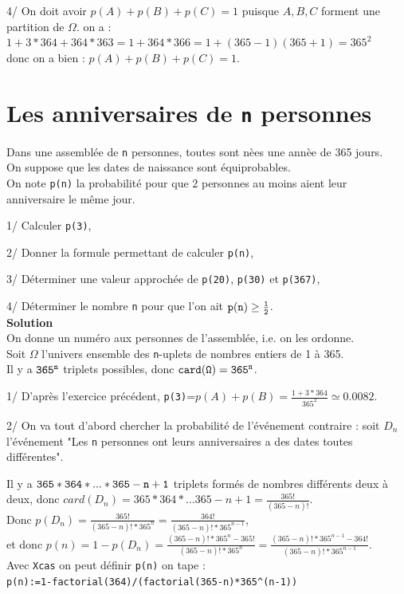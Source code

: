 \documentclass[a4paper,11pt]{book}
\begin{document}
4/ On doit avoir $p(A)+p(B)+p(C)=1$ puisque $A,B,C$ forment une partition de 
 $\Omega$. on a :\\
$1+3*364+364*363=1+364*366=1+(365-1)(365+1)=365^2$\\
donc on a bien : $p(A)+p(B)+p(C)=1$.\\
\section{Les anniversaires de {\tt n} personnes}
Dans une assembl\'ee de {\tt n} personnes, toutes sont n\`ees une ann\`ee de 
365 jours.\\
On suppose que les dates de naissance sont \'equiprobables.\\
On note {\tt p(n)} la probabilit\'e pour que 2 personnes au moins aient leur 
anniversaire le m\^eme jour.

1/ Calculer {\tt p(3)},

2/ Donner la formule permettant de calculer {\tt p(n)},

3/ D\'eterminer une valeur approch\'ee de 
{\tt p(20)}, {\tt p(30)} et {\tt p(367)},

4/ D\'eterminer le nombre {\tt n} pour que l'on ait 
${\tt p(n)\geq \frac{1}{2}}$.\\

{\bf Solution}\\
On donne un num\'ero aux personnes de l'assembl\'ee, i.e. on les ordonne.\\
Soit $\Omega$ l'univers ensemble des {\tt n}-uplets de nombres entiers de 1 
\`a 365.\\ 
Il y a ${\tt 365^n}$ triplets possibles, donc ${\tt card(\Omega)=365^n}$.

1/ D'apr\`es l'exercice pr\'ec\'edent, {\tt p(3)}=$p(A)+p(B)=\frac{1+3*364}{365^2}\simeq 0.0082$.

2/ On va tout d'abord chercher la probabilit\'e de l'\'ev\'enement contraire :
soit $D_n$ l'\'ev\'enement "Les {\tt n} personnes ont leurs anniversaires 
a des dates toutes diff\'erentes".

Il y a ${\tt 365*364*...*365-n+1}$ triplets form\'es de nombres diff\'erents 
deux \`a deux, donc $card(D_n)=365*364*...365-n+1=\frac{365!}{(365-n)!}$.\\ 
Donc $\displaystyle p(D_n)=\frac{365!}{(365-n)!*365^n}=\frac{364!}{(365-n)!*365^{n-1}}$,\\
et donc $\displaystyle p(n)=1-p(D_n)=\frac{(365-n)!*365^n-365!}{(365-n)!*365^n}=\frac{(365-n)!*365^{n-1}-364!}{(365-n)!*365^{n-1}}$.\\
Avec {\tt Xcas} on peut d\'efinir {\tt p(n)} on tape :\\
{\tt p(n):=1-factorial(364)/(factorial(365-n)*365\verb|^|(n-1))}
\end{document}
